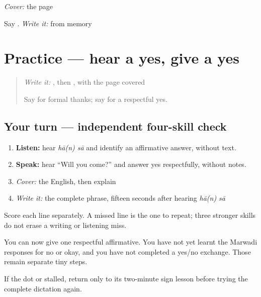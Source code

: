 \begin{tcolorbox}[breakable,colback=teal!4,colframe=teal!35!black,title={Before you move on}]
\emph{Cover:} the page

Say \textbf{ }. \emph{Write it:} \textbf{} from memory
\end{tcolorbox}
\section[Practice]{Practice — hear a yes, give a yes}

\label{lesson:MW-C03-practice}



\begin{quote}
\emph{Write it:} \textbf{}, then \textbf{}, with the page covered

Say \textbf{} for formal thanks; say \textbf{ } for a respectful yes.
\end{quote}

\subsection*{Your turn — independent four-skill check}
\begin{enumerate}
\raggedright
  \item \textbf{Listen:} hear \emph{hā(n) sā} and identify an affirmative answer, without text.
  \item \textbf{Speak:} hear “Will you come?” and answer yes respectfully, without notes.
  \item \emph{Cover:} the English, then explain \textbf{ }
  \item \emph{Write it:} the complete phrase, fifteen seconds after hearing \emph{hā(n) sā}
\end{enumerate}

Score each line separately. A missed line is the one to repeat; three stronger skills do not erase a writing or listening miss.

\begin{grammarlens}[title={What you've built — and what remains}]
You can now give one respectful affirmative. You have not yet learnt the Marwadi responses for no or okay, and you have not completed a yes/no exchange. Those remain separate tiny steps.
\end{grammarlens}

\begin{tcolorbox}[breakable,colback=teal!4,colframe=teal!35!black,title={Before you move on}]
If the dot or \textbf{} stalled, return only to its two-minute sign lesson before trying the complete dictation again.
\end{tcolorbox}
